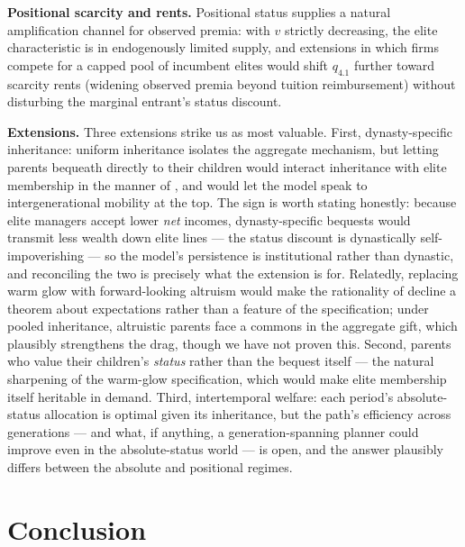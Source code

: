 \documentclass[12pt,letterpaper]{article}
\theoremstyle{definition}
\begin{document}
\textbf{Positional scarcity and rents.}
Positional status supplies a natural amplification channel for observed premia: with $v$ strictly decreasing, the elite characteristic is in endogenously limited supply, and extensions in which firms compete for a capped pool of incumbent elites would shift $q_{4.1}$ further toward scarcity rents (widening observed premia beyond tuition reimbursement) without disturbing the marginal entrant's status discount.

\textbf{Extensions.}
Three extensions strike us as most valuable.
First, dynasty-specific inheritance: uniform inheritance isolates the aggregate mechanism, but letting parents bequeath directly to their children would interact inheritance with elite membership in the manner of \citet{galorzeira1993}, and would let the model speak to intergenerational mobility at the top.
The sign is worth stating honestly: because elite managers accept lower \emph{net} incomes, dynasty-specific bequests would transmit less wealth down elite lines --- the status discount is dynastically self-impoverishing --- so the model's persistence is institutional rather than dynastic, and reconciling the two is precisely what the extension is for.
Relatedly, replacing warm glow with forward-looking altruism would make the rationality of decline a theorem about expectations rather than a feature of the specification; under pooled inheritance, altruistic parents face a commons in the aggregate gift, which plausibly strengthens the drag, though we have not proven this.
Second, parents who value their children's \emph{status} rather than the bequest itself --- the natural sharpening of the warm-glow specification, which would make elite membership itself heritable in demand.
Third, intertemporal welfare: each period's absolute-status allocation is optimal given its inheritance, but the path's efficiency across generations --- and what, if anything, a generation-spanning planner could improve even in the absolute-status world --- is open, and the answer plausibly differs between the absolute and positional regimes.

\section{Conclusion}\label{sec:conclusion}
\end{document}
